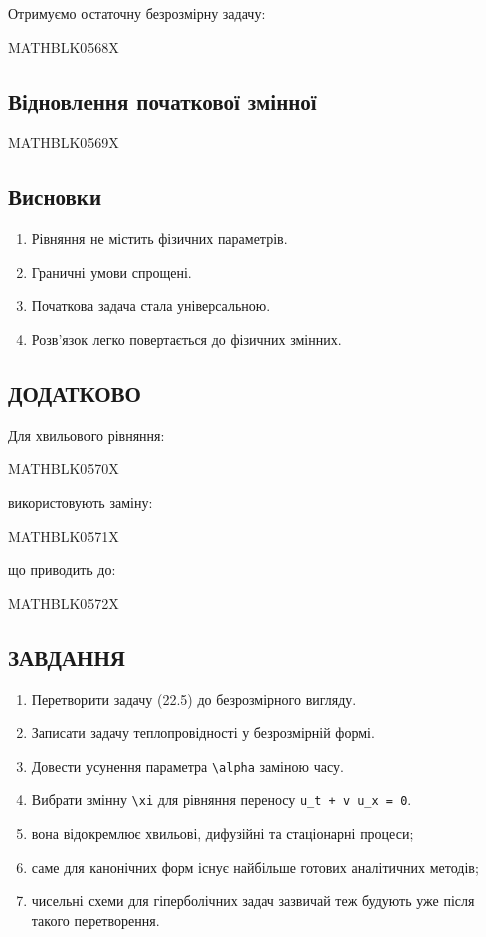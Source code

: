 \documentclass[
  ukrainian,
]{article}
\providecommand{\tightlist}{%
  \setlength{\itemsep}{0pt}\setlength{\parskip}{0pt}}
\begin{document}
Отримуємо остаточну безрозмірну задачу:

MATHBLK0568X

\subsection{Відновлення початкової
змінної}\label{ux432ux456ux434ux43dux43eux432ux43bux435ux43dux43dux44f-ux43fux43eux447ux430ux442ux43aux43eux432ux43eux457-ux437ux43cux456ux43dux43dux43eux457}

MATHBLK0569X

\subsection{Висновки}\label{ux432ux438ux441ux43dux43eux432ux43aux438}

\begin{enumerate}
\def\labelenumi{\arabic{enumi}.}
\tightlist
\item
  Рівняння не містить фізичних параметрів.
\item
  Граничні умови спрощені.
\item
  Початкова задача стала універсальною.
\item
  Розв'язок легко повертається до фізичних змінних.
\end{enumerate}

\subsection{ДОДАТКОВО}\label{ux434ux43eux434ux430ux442ux43aux43eux432ux43e}

Для хвильового рівняння:

MATHBLK0570X

використовують заміну:

MATHBLK0571X

що приводить до:

MATHBLK0572X

\subsection{ЗАВДАННЯ}\label{ux437ux430ux432ux434ux430ux43dux43dux44f-2}

\begin{enumerate}
\def\labelenumi{\arabic{enumi}.}
\tightlist
\item
  Перетворити задачу (22.5) до безрозмірного вигляду.
\item
  Записати задачу теплопровідності у безрозмірній формі.
\item
  Довести усунення параметра \texttt{\textbackslash{}alpha} заміною
  часу.
\item
  Вибрати змінну \texttt{\textbackslash{}xi} для рівняння переносу
  \texttt{u\_t\ +\ v\ u\_x\ =\ 0}.
\item
  вона відокремлює хвильові, дифузійні та стаціонарні процеси;
\item
  саме для канонічних форм існує найбільше готових аналітичних методів;
\item
  чисельні схеми для гіперболічних задач зазвичай теж будують уже після
  такого перетворення.
\end{enumerate}
\end{document}
